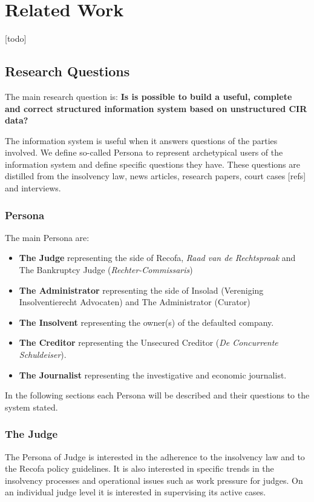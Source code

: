 \section{Related Work}
[todo]

\subsection{Research Questions}

The main research question is:
\textbf{Is is possible to build a useful, complete and correct structured information system based on unstructured CIR data?}

The information system is useful when it answers questions of the parties involved. We define so-called Persona to represent archetypical users of the information system and define specific questions they have. These questions are distilled from the insolvency law, news articles, research papers, court cases [refs] and interviews.

\subsubsection{Persona}
The main Persona are: 
\begin{itemize}
\item \textbf{The Judge} representing the side of Recofa, \textit{Raad van de Rechtspraak} and The Bankruptcy Judge (\textit{Rechter-Commissaris})
\item \textbf{The Administrator} representing the side of Insolad (Vereniging Insolventierecht Advocaten) and The Administrator (Curator) 
\item \textbf{The Insolvent} representing the owner(s) of the defaulted company.
\item \textbf{The Creditor} representing the Unsecured Creditor (\textit{De Concurrente Schuldeiser}).
\item \textbf{The Journalist} representing the investigative and economic journalist.
\end{itemize}

In the following sections each Persona will be described and their questions to the system stated.

\subsubsection{The Judge}
The Persona of Judge is interested in the adherence to the insolvency law and to the Recofa policy guidelines. It is also interested in specific trends in the insolvency processes and operational issues such as work pressure for judges. On an individual judge level it is interested in supervising its active cases.

